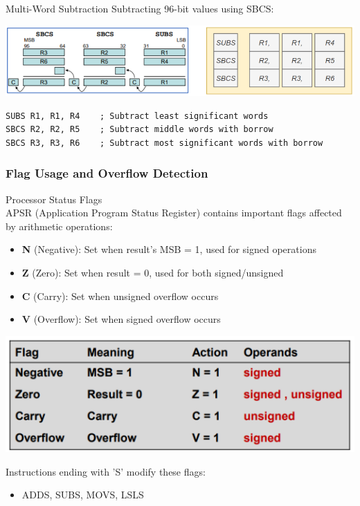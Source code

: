 \begin{example2}{Multi-Word Subtraction}
Subtracting 96-bit values using SBCS:

\includegraphics[width=\linewidth]{images/multiwordsub.png}

\begin{lstlisting}[language=armasm, style=basesmol]
SUBS R1, R1, R4    ; Subtract least significant words
SBCS R2, R2, R5    ; Subtract middle words with borrow
SBCS R3, R3, R6    ; Subtract most significant words with borrow
\end{lstlisting}
\end{example2}

\subsubsection{Flag Usage and Overflow Detection}

\begin{concept}{Processor Status Flags}\\
APSR (Application Program Status Register) contains important flags affected by arithmetic operations:
\begin{itemize}
  \item \textbf{N} (Negative): Set when result's MSB = 1, used for signed operations
  \item \textbf{Z} (Zero): Set when result = 0, used for both signed/unsigned
  \item \textbf{C} (Carry): Set when unsigned overflow occurs
  \item \textbf{V} (Overflow): Set when signed overflow occurs
\end{itemize}

\includegraphics[width=\linewidth]{images/flags-arithmetic.png}

Instructions ending with 'S' modify these flags:
\begin{itemize}
  \item ADDS, SUBS, MOVS, LSLS
\end{itemize}
\end{concept}

